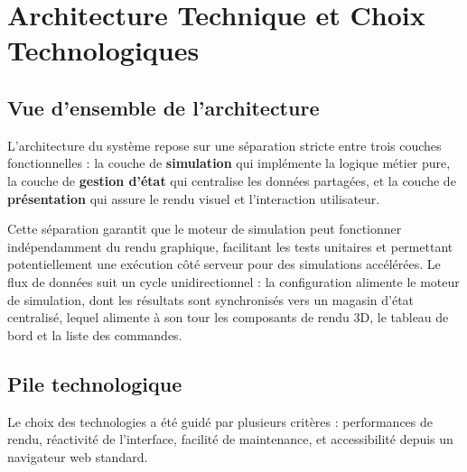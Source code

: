 \documentclass[12pt,a4paper]{report}
\begin{document}
\chapter{Architecture Technique et Choix Technologiques}

\section{Vue d'ensemble de l'architecture}

L'architecture du syst\`eme repose sur une s\'eparation stricte entre trois couches fonctionnelles : la couche de \textbf{simulation} qui impl\'emente la logique m\'etier pure, la couche de \textbf{gestion d'\'etat} qui centralise les donn\'ees partag\'ees, et la couche de \textbf{pr\'esentation} qui assure le rendu visuel et l'interaction utilisateur.

Cette s\'eparation garantit que le moteur de simulation peut fonctionner ind\'ependamment du rendu graphique, facilitant les tests unitaires et permettant potentiellement une ex\'ecution c\^ot\'e serveur pour des simulations acc\'el\'er\'ees. Le flux de donn\'ees suit un cycle unidirectionnel : la configuration alimente le moteur de simulation, dont les r\'esultats sont synchronis\'es vers un magasin d'\'etat centralis\'e, lequel alimente \`a son tour les composants de rendu 3D, le tableau de bord et la liste des commandes.

\section{Pile technologique}

Le choix des technologies a \'et\'e guid\'e par plusieurs crit\`eres : performances de rendu, r\'eactivit\'e de l'interface, facilit\'e de maintenance, et accessibilit\'e depuis un navigateur web standard.
\end{document}
